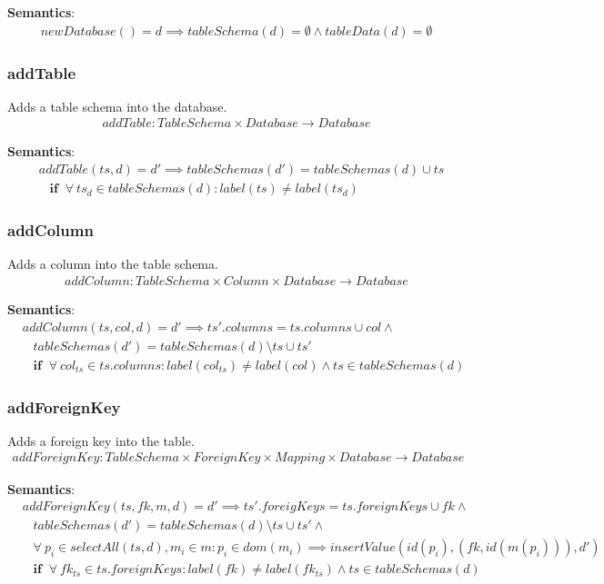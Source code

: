 \documentclass[10pt]{article}
\begin{document}
\noindent \textbf{Semantics}:
\begin{align}
newDatabase() = d \implies tableSchema(d) = \emptyset \land tableData(d) = \emptyset
\end{align}

\subsubsection{addTable}
Adds a table schema into the database.
\begin{align}
addTable: TableSchema \times Database \rightarrow Database
\end{align}

\noindent \textbf{Semantics}:
\begin{align}
& addTable(ts, d) = d' \implies tableSchemas(d') = tableSchemas(d) \cup ts \nonumber \\
& \;\;\; \mathbf{if}  \;\; \forall \: ts_d \in tableSchemas(d) : label(ts) \neq label(ts_d)
\end{align}

\subsubsection{addColumn}
Adds a column into the table schema.
\begin{align}
addColumn: TableSchema \times Column \times Database \rightarrow Database
\end{align}

\noindent \textbf{Semantics}:
\begin{align}
& addColumn(ts, col, d) = d' \implies ts'.columns = ts.columns \cup col \land \nonumber \\
& \;\;\; tableSchemas(d') = tableSchemas(d) \setminus ts \cup ts' \nonumber \\
& \;\;\; \mathbf{if}  \;\;  \forall \: col_{ts} \in ts.columns : label(col_{ts}) \neq label(col) \land ts \in tableSchemas(d)
\end{align}

\subsubsection{addForeignKey}
Adds a foreign key into the table.
\begin{align}
addForeignKey: TableSchema \times ForeignKey \times Mapping \times Database \rightarrow Database
\end{align}

\noindent \textbf{Semantics}:
\begin{align}
& addForeignKey(ts, fk, m, d) = d' \implies ts'.foreigKeys = ts.foreignKeys \cup fk \land \nonumber \\
& \;\;\; tableSchemas(d') = tableSchemas(d) \setminus ts \cup ts' \land \nonumber \\
& \;\;\; \forall \: p_i \in selectAll(ts, d), m_i \in m : p_i \in dom(m_i) \implies insertValue(id(p_i), (fk, id(m(p_i))), d')  \nonumber \\
& \;\;\; \mathbf{if}  \;\;  \forall \: fk_{ts} \in ts.foreignKeys : label(fk) \neq label(fk_{ts}) \land ts \in tableSchemas(d)
\end{align}
\end{document}
